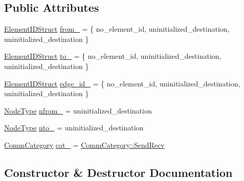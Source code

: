 \subsection*{Public Attributes}
\begin{DoxyCompactItemize}
\item 
\hyperlink{structvt_1_1vrt_1_1collection_1_1balance_1_1_element_i_d_struct}{Element\+I\+D\+Struct} \hyperlink{structvt_1_1vrt_1_1collection_1_1balance_1_1_l_b_comm_key_a0b66e8497552babd15ddbd1f1ae93632}{from\+\_\+} = \{ no\+\_\+element\+\_\+id, uninitialized\+\_\+destination, uninitialized\+\_\+destination \}
\item 
\hyperlink{structvt_1_1vrt_1_1collection_1_1balance_1_1_element_i_d_struct}{Element\+I\+D\+Struct} \hyperlink{structvt_1_1vrt_1_1collection_1_1balance_1_1_l_b_comm_key_a878217deed946f498627af5b7740400c}{to\+\_\+} = \{ no\+\_\+element\+\_\+id, uninitialized\+\_\+destination, uninitialized\+\_\+destination \}
\item 
\hyperlink{structvt_1_1vrt_1_1collection_1_1balance_1_1_element_i_d_struct}{Element\+I\+D\+Struct} \hyperlink{structvt_1_1vrt_1_1collection_1_1balance_1_1_l_b_comm_key_af22d9e63e39344b9931648736082e16b}{edge\+\_\+id\+\_\+} = \{ no\+\_\+element\+\_\+id, uninitialized\+\_\+destination, uninitialized\+\_\+destination \}
\item 
\hyperlink{namespacevt_a866da9d0efc19c0a1ce79e9e492f47e2}{Node\+Type} \hyperlink{structvt_1_1vrt_1_1collection_1_1balance_1_1_l_b_comm_key_abc9aa99cd2f176756be39d326e808cbf}{nfrom\+\_\+} = uninitialized\+\_\+destination
\item 
\hyperlink{namespacevt_a866da9d0efc19c0a1ce79e9e492f47e2}{Node\+Type} \hyperlink{structvt_1_1vrt_1_1collection_1_1balance_1_1_l_b_comm_key_a3350377070bba8f2a4a4027d7b795543}{nto\+\_\+} = uninitialized\+\_\+destination
\item 
\hyperlink{namespacevt_1_1vrt_1_1collection_1_1balance_a9cc6c6884ca0416dae824e9204093c57}{Comm\+Category} \hyperlink{structvt_1_1vrt_1_1collection_1_1balance_1_1_l_b_comm_key_aa1d2709bdb4721255b0ac7ab7706ad31}{cat\+\_\+} = \hyperlink{namespacevt_1_1vrt_1_1collection_1_1balance_a9cc6c6884ca0416dae824e9204093c57a95aeb71ffd419cc14c6929f9dcd6cdff}{Comm\+Category\+::\+Send\+Recv}
\end{DoxyCompactItemize}


\subsection{Constructor \& Destructor Documentation}
\mbox{\label{structvt_1_1vrt_1_1collection_1_1balance_1_1_l_b_comm_key_a0de8943d958aa8cb66822cbe146e9436}} 
